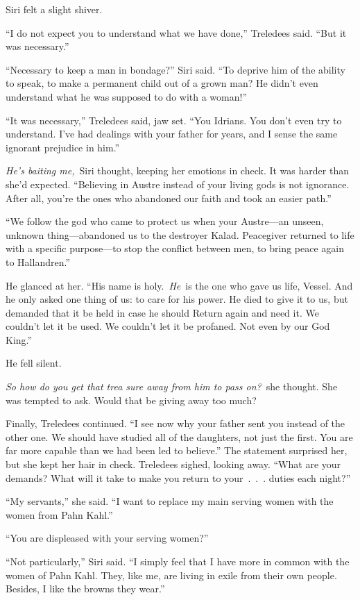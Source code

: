 Siri felt a slight shiver.

“I do not expect you to understand what we have done,” Treledees said. “But it was necessary.”

“Necessary to keep a man in bondage?” Siri said. “To deprive him of the ability to speak, to make a permanent child out of a grown man? He didn’t even understand what he was supposed to do with a woman!”

“It was necessary,” Treledees said, jaw set. “You Idrians. You don’t even try to understand. I’ve had dealings with your father for years, and I sense the same ignorant prejudice in him.”

\textit{He’s baiting me,}~Siri thought, keeping her emotions in check. It was harder than she’d expected. “Believing in Austre instead of your living gods is not ignorance. After all, you’re the ones who abandoned our faith and took an easier path.”

“We follow the god who came to protect us when your Austre—an unseen, unknown thing—abandoned us to the destroyer Kalad. Peacegiver returned to life with a specific purpose—to stop the conflict between men, to bring peace again to Hallandren.”

He glanced at her. “His name is holy.~\textit{He}~is the one who gave us life, Vessel. And he only asked one thing of us: to care for his power. He died to give it to us, but demanded that it be held in case he should Return again and need it. We couldn’t let it be used. We couldn’t let it be profaned. Not even by our God King.”

He fell silent.

\textit{So how do you get that trea sure away from him to pass on?}~she thought. She was tempted to ask. Would that be giving away too much?

Finally, Treledees continued. “I see now why your father sent you instead of the other one. We should have studied all of the daughters, not just the first. You are far more capable than we had been led to believe.” The statement surprised her, but she kept her hair in check. Treledees sighed, looking away. “What are your demands? What will it take to make you return to your~.~.~. duties each night?”

“My servants,” she said. “I want to replace my main serving women with the women from Pahn Kahl.”

“You are displeased with your serving women?”

“Not particularly,” Siri said. “I simply feel that I have more in common with the women of Pahn Kahl. They, like me, are living in exile from their own people. Besides, I like the browns they wear.”

